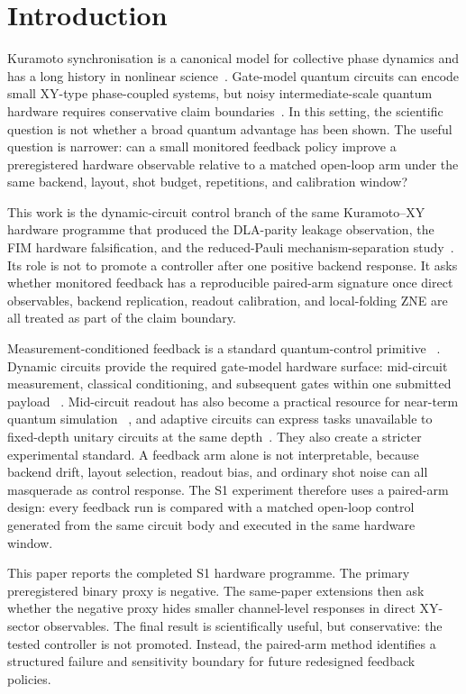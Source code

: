 \documentclass[preprint,aps,physrev,superscriptaddress,floatfix,longbibliography]{revtex4-2}
\begin{document}
\section{Introduction}

Kuramoto synchronisation is a canonical model for collective phase dynamics
and has a long history in nonlinear science~\cite{Kuramoto1975,Acebron2005}.
Gate-model quantum circuits can encode small XY-type phase-coupled systems,
but noisy intermediate-scale quantum hardware requires conservative claim
boundaries~\cite{Preskill2018,NielsenChuang2010}. In this setting, the
scientific question is not whether a broad quantum advantage has been shown.
The useful question is narrower: can a small monitored feedback policy improve
a preregistered hardware observable relative to a matched open-loop arm under
the same backend, layout, shot budget, repetitions, and calibration window?

This work is the dynamic-circuit control branch of the same Kuramoto--XY
hardware programme that produced the DLA-parity leakage observation, the FIM
hardware falsification, and the reduced-Pauli mechanism-separation
study~\cite{SotekDLA2026,SotekFIM2026,SotekPhase3ReducedPauli2026}. Its role is
not to promote a controller after one positive backend response. It asks
whether monitored feedback has a reproducible paired-arm signature once direct
observables, backend replication, readout calibration, and local-folding ZNE
are all treated as part of the claim boundary.

Measurement-conditioned feedback is a standard quantum-control primitive
~\cite{WisemanMilburn2010}. Dynamic circuits provide the required gate-model
hardware surface: mid-circuit measurement, classical conditioning, and
subsequent gates within one submitted payload
~\cite{Corcoles2021,IBMQuantum,Qiskit2024}. Mid-circuit readout has also
become a practical resource for near-term quantum simulation
~\cite{Koh2023}, and adaptive circuits can express tasks unavailable to
fixed-depth unitary circuits at the same depth~\cite{FossFeig2023}. They also
create a stricter experimental standard. A feedback arm alone is not
interpretable, because backend drift, layout selection, readout bias, and
ordinary shot noise can all masquerade as control response. The S1 experiment
therefore uses a paired-arm design: every feedback run is compared with a
matched open-loop control generated from the same circuit body and executed in
the same hardware window.

This paper reports the completed S1 hardware programme. The primary
preregistered binary proxy is negative. The same-paper extensions then ask
whether the negative proxy hides smaller channel-level responses in direct
XY-sector observables. The final result is scientifically useful, but
conservative: the tested controller is not promoted. Instead, the paired-arm
method identifies a structured failure and sensitivity boundary for future
redesigned feedback policies.
\end{document}

